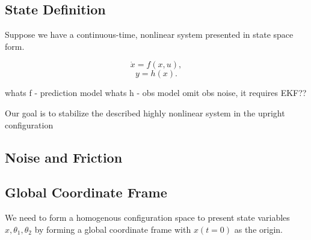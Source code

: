 \documentclass[journal]{IEEEtran}
\begin{document}





\subsection{State Definition}
Suppose we have a continuous-time, nonlinear system presented in state space
form.

\begin{equation}
    \dot{x} = f(x,u),
\end{equation}
\begin{equation}
    y = h(x).
\end{equation}

whats f - prediction model
whats h - obs model
omit obs noise, it requires EKF??

Our goal is to stabilize the described highly nonlinear system in the upright
configuration

\subsection{Noise and Friction}

\subsection{Global Coordinate Frame}
We need to form a homogenous configuration space to present state variables
\(x, \theta_1, \theta_2\) by forming a global coordinate frame with \(x(t=0)\)
as the origin.
\end{document}
